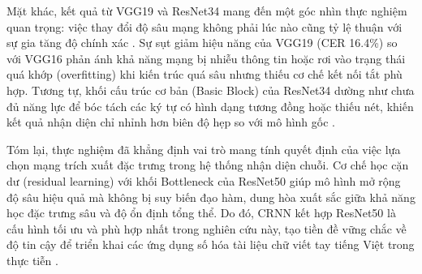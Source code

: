 Mặt khác, kết quả từ VGG19 và ResNet34 mang đến một góc nhìn thực nghiệm quan trọng: việc thay đổi độ sâu mạng không phải lúc nào cũng tỷ lệ thuận với sự gia tăng độ chính xác \cite{Reference23,Reference24}. Sự sụt giảm hiệu năng của VGG19 (CER 16.4\%) so với VGG16 phản ánh khả năng mạng bị nhiễu thông tin hoặc rơi vào trạng thái quá khớp (overfitting) khi kiến trúc quá sâu nhưng thiếu cơ chế kết nối tắt phù hợp. Tương tự, khối cấu trúc cơ bản (Basic Block) của ResNet34 dường như chưa đủ năng lực để bóc tách các ký tự có hình dạng tương đồng hoặc thiếu nét, khiến kết quả nhận diện chỉ nhỉnh hơn biên độ hẹp so với mô hình gốc \cite{Reference23}.

Tóm lại, thực nghiệm đã khẳng định vai trò mang tính quyết định của việc lựa chọn mạng trích xuất đặc trưng trong hệ thống nhận diện chuỗi. Cơ chế học cặn dư (residual learning) với khối Bottleneck của ResNet50 giúp mô hình mở rộng độ sâu hiệu quả mà không bị suy biến đạo hàm, dung hòa xuất sắc giữa khả năng học đặc trưng sâu và độ ổn định tổng thể. Do đó, CRNN kết hợp ResNet50 là cấu hình tối ưu và phù hợp nhất trong nghiên cứu này, tạo tiền đề vững chắc về độ tin cậy để triển khai các ứng dụng số hóa tài liệu chữ viết tay tiếng Việt trong thực tiễn \cite{Reference23}.
